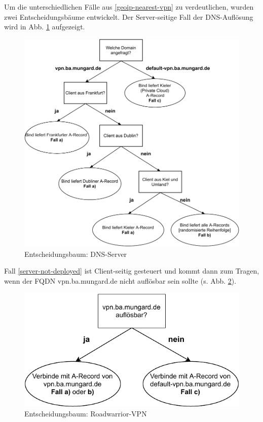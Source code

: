 Um die unterschiedlichen Fälle aus \ref{geoip-nearest-vpn} zu verdeutlichen, wurden zwei Entscheidungsbäume entwickelt. Der Server-seitige Fall der \gls{DNS}-Auflösung wird in Abb. \ref{grafik:Use-Case_2_Entscheidungsbaum_GeoIP} aufgezeigt.
\begin{figure}[h]
  \centering
  \includegraphics{Figures/entscheidungsbaum_bind_geoip.pdf}
  \caption{Entscheidungsbaum: \gls{DNS}-Server}
  \label{grafik:Use-Case_2_Entscheidungsbaum_GeoIP}
\end{figure}\FloatBarrier

Fall \ref{server-not-deployed} ist \gls{Client}-seitig gesteuert und kommt dann zum Tragen, wenn der \gls{FQDN} vpn.ba.mungard.de nicht auflösbar sein sollte (s. Abb. \ref{grafik:Use-Case_2_Entscheidungsbaum_OpenVPN}).

\begin{figure}[h]
  \centering
  \includegraphics{Figures/entscheidungsbaum_openvpn_config.pdf}
  \caption{Entscheidungsbaum: \gls{Roadwarrior}-\gls{VPN}}
  \label{grafik:Use-Case_2_Entscheidungsbaum_OpenVPN}
\end{figure}\FloatBarrier

